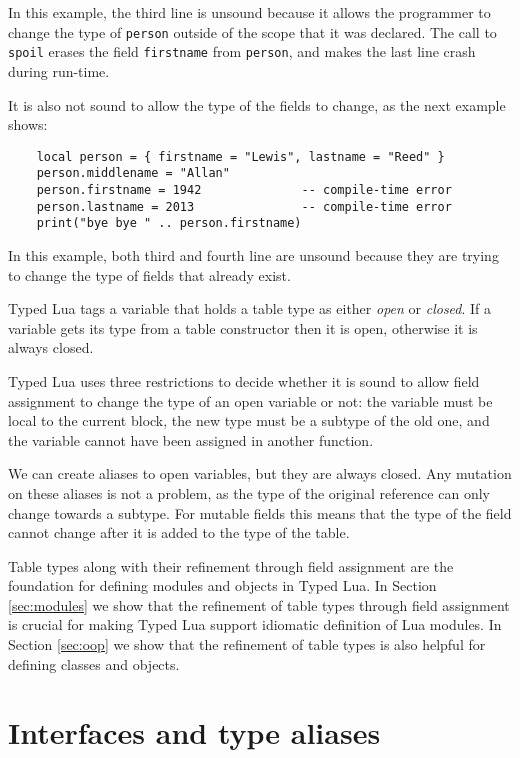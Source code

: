 In this example, the third line is unsound because it allows the
programmer to change the type of \texttt{person} outside of the scope
that it was declared.
The call to \texttt{spoil} erases the field \texttt{firstname} from
\texttt{person}, and makes the last line crash during run-time.

It is also not sound to allow the type of the fields to change,
as the next example shows:
\begin{verbatim}
    local person = { firstname = "Lewis", lastname = "Reed" }
    person.middlename = "Allan"
    person.firstname = 1942              -- compile-time error
    person.lastname = 2013               -- compile-time error
    print("bye bye " .. person.firstname)
\end{verbatim}

In this example, both third and fourth line are unsound because
they are trying to change the type of fields that already exist.

Typed Lua tags a variable that holds a table type as either
\emph{open} or \emph{closed}.
If a variable gets its type from a table constructor then it
is open, otherwise it is always closed.

Typed Lua uses three restrictions to decide whether it is
sound to allow field assignment to change the type of an
open variable or not:
the variable must be local to the current block,
the new type must be a subtype of the old one, and
the variable cannot have been assigned in another function.

We can create aliases to open variables, but they are always closed.
Any mutation on these aliases is not a problem, as the type of
the original reference can only change towards a subtype.
For mutable fields this means that the type of the field cannot
change after it is added to the type of the table.

Table types along with their refinement through field assignment
are the foundation for defining modules and objects in Typed Lua.
In Section \ref{sec:modules} we show that the refinement of table
types through field assignment is crucial for making Typed Lua
support idiomatic definition of Lua modules.
In Section \ref{sec:oop} we show that the refinement of table
types is also helpful for defining classes and objects.

\section{Interfaces and type aliases}
\label{sec:alias}

